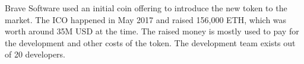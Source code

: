 Brave Software used an initial coin offering to introduce the new token to the market. The ICO happened in May 2017 and raised 156,000 ETH, which was worth around 35M USD at the time. The raised money is mostly used to pay for the development and other costs of the token. The development team exists out of 20 developers.


